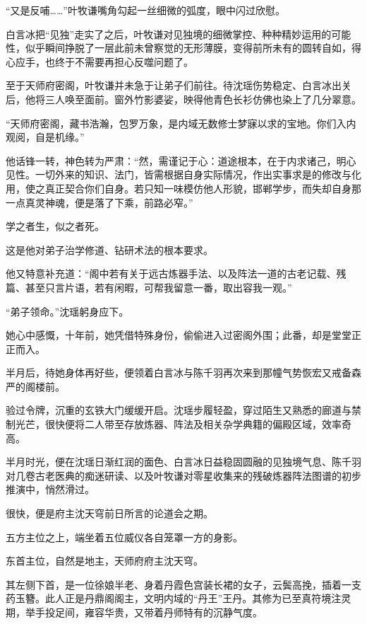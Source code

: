 “又是反哺……”叶牧谦嘴角勾起一丝细微的弧度，眼中闪过欣慰。

白言冰把“见独”走实了之后，叶牧谦对见独境的细微掌控、种种精妙运用的可能性，似乎瞬间挣脱了一层此前未曾察觉的无形薄膜，变得前所未有的圆转自如，得心应手，也终于不需要再担心反噬问题了。

\vspace{2em}

至于天师府密阁，叶牧谦并未急于让弟子们前往。待沈瑶伤势稳定、白言冰出关后，他将三人唤至面前。窗外竹影婆娑，映得他青色长衫仿佛也染上了几分翠意。

“天师府密阁，藏书浩瀚，包罗万象，是内域无数修士梦寐以求的宝地。你们入内观阅，自是机缘。”

他话锋一转，神色转为严肃：“然，需谨记于心：道途根本，在于内求诸己，明心见性。一切外来的知识、法门，皆需根据自身实际情况，作出实事求是的修改与化用，使之真正契合你们自身。若只知一味模仿他人形貌，邯郸学步，而失却自身那一点真灵神魂，便是落了下乘，前路必窄。”

学之者生，似之者死。

这是他对弟子治学修道、钻研术法的根本要求。

他又特意补充道：“阁中若有关于远古炼器手法、以及阵法一道的古老记载、残篇、甚至只言片语，若有闲暇，可帮我留意一番，取出容我一观。”

“弟子领命。”沈瑶躬身应下。

她心中感慨，十年前，她凭借特殊身份，偷偷进入过密阁外围；此番，却是堂堂正正而入。

半月后，待她身体再好些，便领着白言冰与陈千羽再次来到那幢气势恢宏又戒备森严的阁楼前。

验过令牌，沉重的玄铁大门缓缓开启。沈瑶步履轻盈，穿过陌生又熟悉的廊道与禁制光芒，很快便将二人带至存放炼器、阵法及相关杂学典籍的偏殿区域，效率奇高。

\vspace{2em}

半月时光，便在沈瑶日渐红润的面色、白言冰日益稳固圆融的见独境气息、陈千羽对几卷古老医典的痴迷研读、以及叶牧谦对零星收集来的残破炼器阵法图谱的初步推演中，悄然滑过。

\vspace{2em}

很快，便是府主沈天穹前日所言的论道会之期。

五方主位之上，端坐着五位威仪各自笼罩一方的身影。

东首主位，自然是地主，天师府府主沈天穹。

其左侧下首，是一位徐娘半老、身着丹霞色宫装长裙的女子，云鬓高挽，插着一支药玉簪。此人正是丹鼎阁阁主，文明内域的“丹王”王丹。其修为已至真符境注灵期，举手投足间，雍容华贵，又带着丹师特有的沉静气度。

